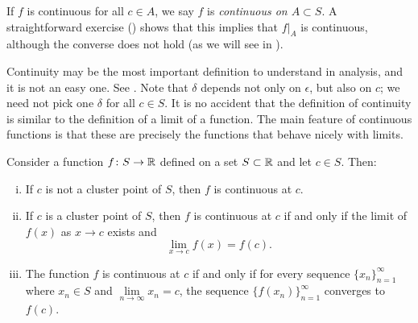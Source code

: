 If $f$ is continuous for all $c \in A$, we say
$f$ is \emph{continuous on $A \subset S$}.  A straightforward
exercise ()
shows that this implies that $f|_A$ is continuous, although
the converse does not hold (as we will see in ).

Continuity may be the most important definition to understand in analysis,
and it is not an easy one.  See .
Note that $\delta$ depends not only
on $\epsilon$, but also on $c$;  we need not pick
one $\delta$ for all $c \in S$.
It is no accident 
that the definition of continuity is similar to the definition of a
limit of a function.  The main feature of continuous functions
is that these are precisely the functions that behave nicely with limits.

\begin{prop} \label{contbasic:prop}
Consider a function $f \colon S \to {\mathbb{R}}$ defined on a set  $S \subset {\mathbb{R}}$
and let $c \in S$.
Then:
\begin{enumerate}[(i)]
\item \label{contbasic:prop:i}
If $c$ is not a cluster point of $S$, then $f$ is continuous at $c$.
\item \label{contbasic:prop:ii}
If $c$ is a cluster point of $S$, then $f$ is continuous at $c$
if and only if the limit of $f(x)$ as $x \to c$ exists and
\begin{equation*}
\lim_{x\to c} f(x) = f(c) .
\end{equation*}
\item \label{contbasic:prop:iii}
The function $f$ is continuous at $c$ if and only if for every sequence
$\{ x_n \}_{n=1}^\infty$
where $x_n \in S$ and $\lim\limits_{n\to\infty} x_n = c$, the sequence
$\bigl\{ f(x_n) \bigr\}_{n=1}^\infty$ converges
to $f(c)$.
\end{enumerate}
\end{prop}

